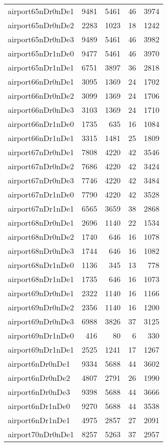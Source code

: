 \begin{longtable}{lrrrr}
airport65nDr0nDe1 & 9481 & 5461 & 46 & 3974 \\
airport65nDr0nDe2 & 2283 & 1023 & 18 & 1242 \\
airport65nDr0nDe3 & 9489 & 5461 & 46 & 3982 \\
airport65nDr1nDe0 & 9477 & 5461 & 46 & 3970 \\
airport65nDr1nDe1 & 6751 & 3897 & 36 & 2818 \\
airport66nDr0nDe1 & 3095 & 1369 & 24 & 1702 \\
airport66nDr0nDe2 & 3099 & 1369 & 24 & 1706 \\
airport66nDr0nDe3 & 3103 & 1369 & 24 & 1710 \\
airport66nDr1nDe0 & 1735 & 635 & 16 & 1084 \\
airport66nDr1nDe1 & 3315 & 1481 & 25 & 1809 \\
airport67nDr0nDe1 & 7808 & 4220 & 42 & 3546 \\
airport67nDr0nDe2 & 7686 & 4220 & 42 & 3424 \\
airport67nDr0nDe3 & 7746 & 4220 & 42 & 3484 \\
airport67nDr1nDe0 & 7790 & 4220 & 42 & 3528 \\
airport67nDr1nDe1 & 6565 & 3659 & 38 & 2868 \\
airport68nDr0nDe1 & 2696 & 1140 & 22 & 1534 \\
airport68nDr0nDe2 & 1740 & 646 & 16 & 1078 \\
airport68nDr0nDe3 & 1744 & 646 & 16 & 1082 \\
airport68nDr1nDe0 & 1136 & 345 & 13 & 778 \\
airport68nDr1nDe1 & 1735 & 646 & 16 & 1073 \\
airport69nDr0nDe1 & 2322 & 1140 & 16 & 1166 \\
airport69nDr0nDe2 & 2356 & 1140 & 16 & 1200 \\
airport69nDr0nDe3 & 6988 & 3826 & 37 & 3125 \\
airport69nDr1nDe0 & 416 & 80 & 6 & 330 \\
airport69nDr1nDe1 & 2525 & 1241 & 17 & 1267 \\
airport6nDr0nDe1 & 9334 & 5688 & 44 & 3602 \\
airport6nDr0nDe2 & 4807 & 2791 & 26 & 1990 \\
airport6nDr0nDe3 & 9398 & 5688 & 44 & 3666 \\
airport6nDr1nDe0 & 9270 & 5688 & 44 & 3538 \\
airport6nDr1nDe1 & 4975 & 2857 & 27 & 2091 \\
airport70nDr0nDe1 & 8257 & 5263 & 37 & 2957 \\

\end{longtable}
